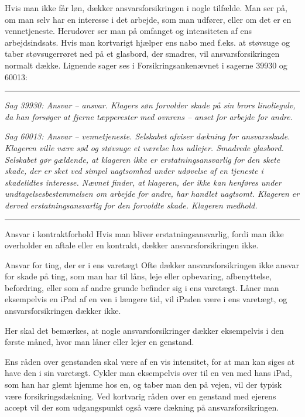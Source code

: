 \documentclass[]{book}
\begin{document}
Hvis man ikke får løn, dækker ansvarsforsikringen i nogle tilfælde. Man ser på, om man selv har en interesse i det arbejde, som man udfører, eller om det er en vennetjeneste. Herudover ser man på omfanget og intensiteten af ens arbejdsindsats. Hvis man kortvarigt hjælper ens nabo med f.eks. at støvsuge og taber støvsugerrøret ned på et glasbord, der smadres, vil ansvarsforsikringen normalt dække. Lignende sager ses i Forsikringsankenævnet i sagerne 39930 og 60013:

\begin{center}\rule{0.5\linewidth}{\linethickness}\end{center}

\emph{Sag 39930: Ansvar -- ansvar. Klagers søn forvolder skade på sin brors linoliegulv, da han forsøger at fjerne tæpperester med ovnrens -- anset for arbejde for andre.}

\emph{Sag 60013: Ansvar -- vennetjeneste. Selskabet afviser dækning for ansvarsskade. Klageren ville være sød og støvsuge et værelse hos udlejer. Smadrede glasbord. Selskabet gør gældende, at klageren ikke er erstatningsansvarlig for den skete skade, der er sket ved simpel uagtsomhed under udøvelse af en tjeneste i skadelidtes interesse. Nævnet finder, at klageren, der ikke kan henføres under undtagelsesbestemmelsen om arbejde for andre, har handlet uagtsomt. Klageren er derved erstatningsansvarlig for den forvoldte skade. Klageren medhold.}

\begin{center}\rule{0.5\linewidth}{\linethickness}\end{center}

Ansvar i kontraktforhold
Hvis man bliver erstatningsansvarlig, fordi man ikke overholder en aftale eller en kontrakt, dækker ansvarsforsikringen ikke.

Ansvar for ting, der er i ens varetægt
Ofte dækker ansvarsforsikringen ikke ansvar for skade på ting, som man har til låns, leje eller opbevaring, afbenyttelse, befordring, eller som af andre grunde befinder sig i ens varetægt. Låner man eksempelvis en iPad af en ven i længere tid, vil iPaden være i ens varetægt, og ansvarsforsikringen dækker ikke.

Her skal det bemærkes, at nogle ansvarsforsikringer dækker eksempelvis i den første måned, hvor man låner eller lejer en genstand.

Ens råden over genstanden skal være af en vis intensitet, for at man kan siges at have den i sin varetægt. Cykler man eksempelvis over til en ven med hans iPad, som han har glemt hjemme hos en, og taber man den på vejen, vil der typisk være forsikringsdækning. Ved kortvarig råden over en genstand med ejerens accept vil der som udgangspunkt også være dækning på ansvarsforsikringen.
\end{document}
